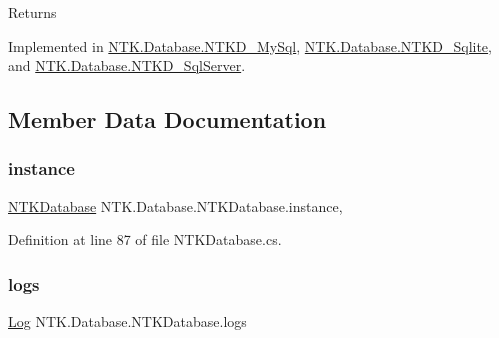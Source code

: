 \begin{DoxyReturn}{Returns}

\end{DoxyReturn}


Implemented in \mbox{\hyperlink{class_n_t_k_1_1_database_1_1_n_t_k_d___my_sql_afc4726c38df980c6da5a1c41711da387}{N\+T\+K.\+Database.\+N\+T\+K\+D\+\_\+\+My\+Sql}}, \mbox{\hyperlink{class_n_t_k_1_1_database_1_1_n_t_k_d___sqlite_a328887404644a1e7c27aedfba50399d7}{N\+T\+K.\+Database.\+N\+T\+K\+D\+\_\+\+Sqlite}}, and \mbox{\hyperlink{class_n_t_k_1_1_database_1_1_n_t_k_d___sql_server_ae10ab9b2cb44ca086117cac435c5bff1}{N\+T\+K.\+Database.\+N\+T\+K\+D\+\_\+\+Sql\+Server}}.



\subsection{Member Data Documentation}
\mbox{\label{class_n_t_k_1_1_database_1_1_n_t_k_database_a66463cea15f30c1bfb12c36c55a5e0e1}} 
\subsubsection{\texorpdfstring{instance}{instance}}
{\footnotesize\ttfamily \mbox{\hyperlink{class_n_t_k_1_1_database_1_1_n_t_k_database}{N\+T\+K\+Database}} N\+T\+K.\+Database.\+N\+T\+K\+Database.\+instance\hspace{0.3cm}{\ttfamily [static]}, {\ttfamily [protected]}}







Definition at line 87 of file N\+T\+K\+Database.\+cs.

\mbox{\label{class_n_t_k_1_1_database_1_1_n_t_k_database_a85ba1fee5a64697b435f2464bfde163e}} 
\subsubsection{\texorpdfstring{logs}{logs}}
{\footnotesize\ttfamily \mbox{\hyperlink{class_n_t_k_1_1_i_o_1_1_log}{Log}} N\+T\+K.\+Database.\+N\+T\+K\+Database.\+logs\hspace{0.3cm}{\ttfamily [protected]}}







